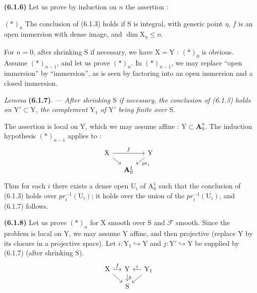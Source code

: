 \documentclass[11pt,leqno]{article}
\begin{document}
\textbf{(6.1.6)} Let us prove by induction on \(n\) the assertion :

\((*)_n\) The conclusion of (6.1.3) holds if \(\mathrm{S}\) is
integral, with generic point \(\eta\), \(f\) is an open
immersion with dense image, and \(\dim\mathrm{X}_\eta\leq n\).

For \(n=0\), after shrinking \(\mathrm{S}\) if necessary, we have
\(\mathrm{X}=\mathrm{Y}\) : \((*)_0\) is obvious. Assume
\((*)_{n-1}\), and let us prove \((*)_n\). In \((*)_{n-1}\), we may
replace “open immersion” by “immersion”, as is seen
by factoring into an open immersion and a closed immersion.

\textit{Lemma} \textbf{(6.1.7)}. — \textit{After shrinking
\(\mathrm{S}\) if necessary, the conclusion of \textup{(6.1.3)} holds on
\(\mathrm{Y}'\subset\mathrm{Y}\), the complement \(\mathrm{Y}_1\)
of \(\mathrm{Y}'\) being finite over \(\mathrm{S}\).}

The assertion is local on \(\mathrm{Y}\), which we may assume
affine : \(\mathrm{Y}\subset\mathbf{A}_{\mathrm{S}}^n\).
The induction hypothesis \((*)_{n-1}\) applies to :
\[
\begin{tikzcd}[column sep=small,row sep=small]
\mathrm{X} \arrow[rr,"f"] \arrow[dr] &&
\mathrm{Y} \arrow[dl,"\mathrm{pr}_i"] \\
& \mathbf{A}_{\mathrm{S}}^1 &
\end{tikzcd}
\]
Thus for each \(i\) there exists a dense open \(\mathrm{U}_i\)
of \(\mathrm{A}_{\mathrm{S}}^1\) such that the conclusion of (6.1.3)
holds over \(\mathit{pr}_i^{-1}(\mathrm{U}_i)\); it holds
over the union of the \(\mathit{pr}_i^{-1}(\mathrm{U}_i)\),
and (6.1.7) follows.

\textbf{(6.1.8)} Let us prove \((*)_n\) for \(\mathrm{X}\) smooth over
\(\mathrm{S}\) and \(\mathscr{F}\) smooth. Since the problem is local
on \(\mathrm{Y}\), we may assume \(\mathrm{Y}\) affine, and then
projective (replace \(\mathrm{Y}\) by its closure in a projective
space). Let \(i:\mathrm{Y}_1\hookrightarrow\mathrm{Y}\) and
\(j:\mathrm{Y}'\hookrightarrow\mathrm{Y}\) be supplied by (6.1.7)
(after shrinking \(\mathrm{S}\)).
\[
\begin{tikzcd}[column sep=small,row sep=small]
\mathrm{X} \arrow[r,hook,"f"] \arrow[dr] &
\mathrm{Y} \arrow[d,"b"] &
\mathrm{Y}_1 \arrow[l,"i"'] \arrow[dl] \\
& \mathrm{S} &
\end{tikzcd}
\]
\end{document}
